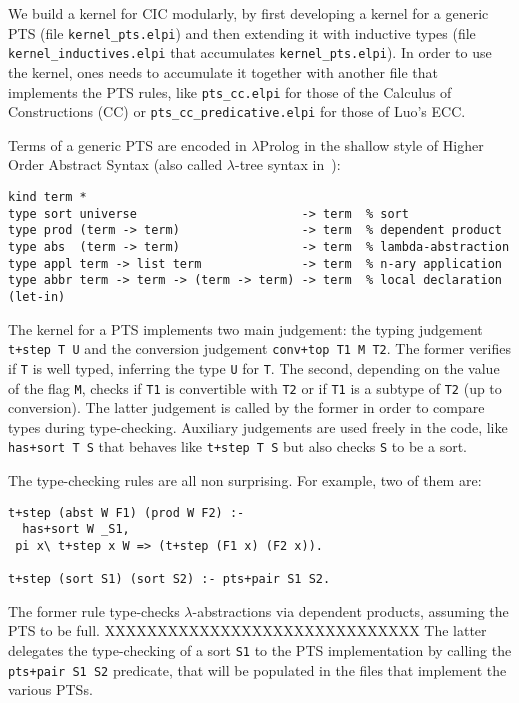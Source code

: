We build a kernel for CIC modularly, by first developing a kernel for a generic PTS (file \verb+kernel_pts.elpi+) and then extending it with inductive types (file \verb+kernel_inductives.elpi+ that accumulates \verb+kernel_pts.elpi+). In order to use the kernel, ones needs to accumulate it together with another file that implements the PTS rules, like \verb+pts_cc.elpi+ for those of the Calculus of Constructions (CC) or \verb+pts_cc_predicative.elpi+ for those of Luo's ECC.

Terms of a generic PTS are encoded in $\lambda$Prolog in the shallow style of Higher Order Abstract Syntax (also called $\lambda$-tree syntax in~\cite{??}):
\begin{verbatim}
kind term *
type sort universe                       -> term  % sort
type prod (term -> term)                 -> term  % dependent product
type abs  (term -> term)                 -> term  % lambda-abstraction
type appl term -> list term              -> term  % n-ary application
type abbr term -> term -> (term -> term) -> term  % local declaration (let-in)
\end{verbatim}

The kernel for a PTS implements two main judgement: the typing judgement \verb-t+step T U- and the conversion judgement \verb-conv+top T1 M T2-. The former verifies if \verb+T+ is well typed, inferring the type \verb+U+ for \verb+T+. The second, depending on the value of the flag \verb+M+, checks if \verb+T1+ is convertible with \verb+T2+ or if \verb+T1+ is a subtype of \verb+T2+ (up to conversion). The latter judgement is called by the former in order to compare types during type-checking. Auxiliary judgements are used freely in the code, like \verb-has+sort T S- that behaves like \verb-t+step T S- but also checks \verb+S+ to be a sort.

The type-checking rules are all non surprising. For example, two of them are:
\begin{verbatim}
t+step (abst W F1) (prod W F2) :-
  has+sort W _S1,
 pi x\ t+step x W => (t+step (F1 x) (F2 x)).

t+step (sort S1) (sort S2) :- pts+pair S1 S2.
\end{verbatim}

The former rule type-checks $\lambda$-abstractions via dependent products, assuming the PTS to be full. XXXXXXXXXXXXXXXXXXXXXXXXXXXXXX
The latter delegates the type-checking of a sort \verb+S1+ to the PTS implementation by calling the \verb-pts+pair S1 S2- predicate, that will be populated in the files that implement the various PTSs.

